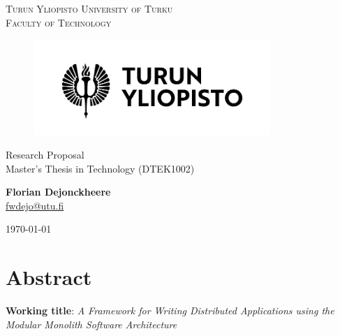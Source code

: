 \documentclass[12pt]{article}
\makeatletter
\newcommand{\faculty}{Faculty of Technology}
\newcommand{\course}{Master's Thesis in Technology (DTEK1002)}
\newcommand{\documenttitle}{Research Proposal}
\newcommand{\authorname}{Florian Dejonckheere}
\newcommand{\authoremail}{fwdejo@utu.fi}
\newcommand{\documentdate}{\today}
\makeatother
\begin{document}
	\begin{titlepage}
		\begin{center}
			\textsc{Turun Yliopisto \textemdash \hspace{1mm} University of Turku} \\
			\textsc{\faculty}
		\end{center}
		\begin{figure}[h]
			\vspace{10mm}

			\centering\includegraphics[width=0.8\textwidth]{logo-fi}

			\vspace{20mm}\label{fig:logo}
		\end{figure}
		\begin{center}
			\fontsize{10mm}{7mm}\selectfont
			\textup{\documenttitle} \\
			\textnormal{\Large{\course}} \\

			\vspace{25mm}

			\large{\textbf{\authorname}} \\
			\large{\href{mailto:\authoremail}{\authoremail}} \\

			\vspace{35mm}

			\documentdate
		\end{center}
	\end{titlepage}

	\clearpage


	\tableofcontents

	\cleardoublepage


	\section{Abstract}\label{sec:abstract}

	\textbf{Working title}: \textit{A Framework for Writing Distributed Applications using the Modular Monolith Software Architecture}
\end{document}
